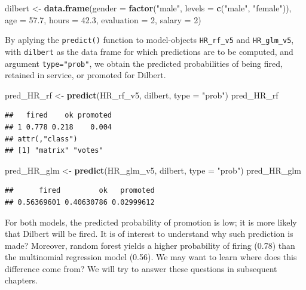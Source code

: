 \documentclass[12pt,]{krantz}
\newenvironment{Shaded}{\begin{snugshade}}{\end{snugshade}}
\newcommand{\DataTypeTok}[1]{\textcolor[rgb]{0.13,0.29,0.53}{#1}}
\newcommand{\DecValTok}[1]{\textcolor[rgb]{0.00,0.00,0.81}{#1}}
\newcommand{\FloatTok}[1]{\textcolor[rgb]{0.00,0.00,0.81}{#1}}
\newcommand{\KeywordTok}[1]{\textcolor[rgb]{0.13,0.29,0.53}{\textbf{#1}}}
\newcommand{\NormalTok}[1]{#1}
\newcommand{\StringTok}[1]{\textcolor[rgb]{0.31,0.60,0.02}{#1}}
\begin{document}
\begin{Shaded}
\begin{Highlighting}[]
\NormalTok{dilbert <-}\StringTok{ }\KeywordTok{data.frame}\NormalTok{(}\DataTypeTok{gender =} \KeywordTok{factor}\NormalTok{(}\StringTok{"male"}\NormalTok{, }\DataTypeTok{levels =} \KeywordTok{c}\NormalTok{(}\StringTok{"male"}\NormalTok{, }\StringTok{"female"}\NormalTok{)),}
                \DataTypeTok{age =} \FloatTok{57.7}\NormalTok{,}
                \DataTypeTok{hours =} \FloatTok{42.3}\NormalTok{,}
                \DataTypeTok{evaluation =} \DecValTok{2}\NormalTok{,}
                \DataTypeTok{salary =} \DecValTok{2}\NormalTok{)}
\end{Highlighting}
\end{Shaded}

By aplying the \texttt{predict()} function to model-objects \texttt{HR\_rf\_v5} and \texttt{HR\_glm\_v5}, with \texttt{dilbert} as the data frame for which predictions are to be computed, and argument \texttt{type="prob"}, we obtain the predicted probabilities of being fired, retained in service, or promoted for Dilbert.

\begin{Shaded}
\begin{Highlighting}[]
\NormalTok{pred_HR_rf <-}\StringTok{ }\KeywordTok{predict}\NormalTok{(HR_rf_v5, dilbert, }\DataTypeTok{type =} \StringTok{"prob"}\NormalTok{)}
\NormalTok{pred_HR_rf}
\end{Highlighting}
\end{Shaded}

\begin{verbatim}
##   fired    ok promoted
## 1 0.778 0.218    0.004
## attr(,"class")
## [1] "matrix" "votes"
\end{verbatim}

\begin{Shaded}
\begin{Highlighting}[]
\NormalTok{pred_HR_glm <-}\StringTok{ }\KeywordTok{predict}\NormalTok{(HR_glm_v5, dilbert, }\DataTypeTok{type =} \StringTok{"prob"}\NormalTok{)}
\NormalTok{pred_HR_glm}
\end{Highlighting}
\end{Shaded}

\begin{verbatim}
##      fired         ok   promoted 
## 0.56369601 0.40630786 0.02999612
\end{verbatim}

For both models, the predicted probability of promotion is low; it is more likely that Dilbert will be fired. It is of interest to understand why such prediction is made? Moreover, random forest yields a higher probability of firing (0.78) than the multinomial regression model (0.56). We may want to learn where does this difference come from? We will try to answer these questions in subsequent chapters.
\end{document}

